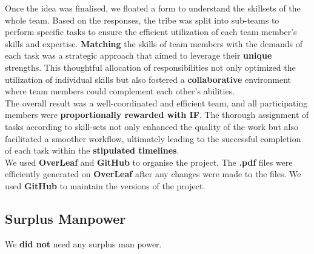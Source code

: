 Once the idea was finalised, we floated a form to understand the skillsets of the whole team. Based on the responses, the tribe was split into sub-teams to perform specific tasks to ensure the efficient utilization of each team member's skills and expertise. \textbf{Matching} the skills of team members with the demands of each task was a strategic approach that aimed to leverage their \textbf{unique} strengths. This thoughtful allocation of responsibilities not only optimized the utilization of individual skills but also fostered a \textbf{collaborative} environment where team members could complement each other's abilities.
\\

The overall result was a well-coordinated and efficient team, and all participating members were \textbf{proportionally rewarded with IF}. The thorough assignment of tasks according to skill-sets not only enhanced the quality of the work but also facilitated a smoother workflow, ultimately leading to the successful completion of each task within the \textbf{stipulated timelines}.
\\

We used \textbf{OverLeaf} and \textbf{GitHub} to organise the project. The \textbf{.pdf} files were efficiently generated on \textbf{OverLeaf} after any changes were made to the files. We used \textbf{GitHub} to maintain the versions of the project. 


\subsection{Surplus Manpower}
We \textbf{did not} need any surplus man power.
